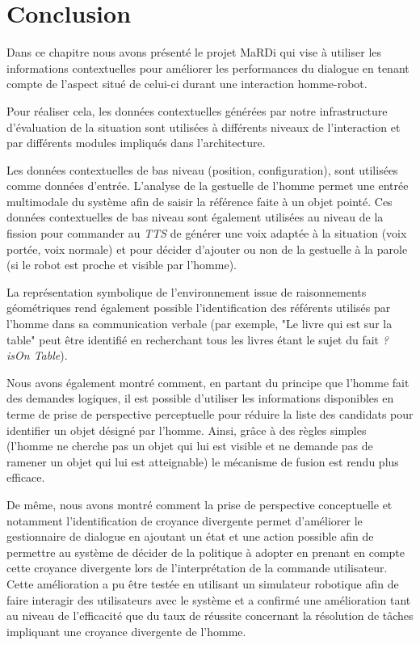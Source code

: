 \documentclass[a4paper,11pt,twoside]{StyleThese}
\begin{document}


\section{Conclusion}
\label{sec:chap3conclusion}
Dans ce chapitre nous avons présenté le projet MaRDi qui vise à utiliser les informations contextuelles pour améliorer les performances du dialogue en tenant compte de l'aspect situé de celui-ci durant une interaction homme-robot.

Pour réaliser cela, les données contextuelles générées par notre infrastructure d'évaluation de la situation sont utilisées à différents niveaux de l'interaction et par différents modules impliqués dans l'architecture.

Les données contextuelles de bas niveau (position, configuration), sont utilisées comme données d'entrée. L'analyse de la gestuelle de l'homme permet une entrée multimodale du système afin de saisir la référence faite à un objet pointé. Ces données contextuelles de bas niveau sont également utilisées au niveau de la fission pour commander au \textit{TTS} de générer une voix adaptée à la situation (voix portée, voix normale) et pour décider d'ajouter ou non de la gestuelle à la parole (si le robot est proche et visible par l'homme).

La représentation symbolique de l'environnement issue de raisonnements géométriques rend également possible l'identification des référents utilisés par l'homme dans sa communication verbale (par exemple, "Le livre qui est sur la table" peut être identifié en recherchant tous les livres étant le sujet du fait \textit{? isOn Table}).

Nous avons également montré comment, en partant du principe que l'homme fait des demandes logiques, il est possible d'utiliser les informations disponibles en terme de prise de perspective perceptuelle pour réduire la liste des candidats pour identifier un objet désigné par l'homme.
Ainsi, grâce à des règles simples (l'homme ne cherche pas un objet qui lui est visible et ne demande pas de ramener un objet qui lui est atteignable) le mécanisme de fusion est rendu plus efficace.

De même, nous avons montré comment la prise de perspective conceptuelle et notamment l'identification de croyance divergente permet d'améliorer le gestionnaire de dialogue en ajoutant un état et une action possible afin de permettre au système de décider de la politique à adopter en prenant en compte cette croyance divergente lors de l'interprétation de la commande utilisateur.
Cette amélioration a pu être testée en utilisant un simulateur robotique afin de faire interagir des utilisateurs avec le système et a confirmé une amélioration tant au niveau de l'efficacité que du taux de réussite concernant la résolution de tâches impliquant une croyance divergente de l'homme.
\end{document}
